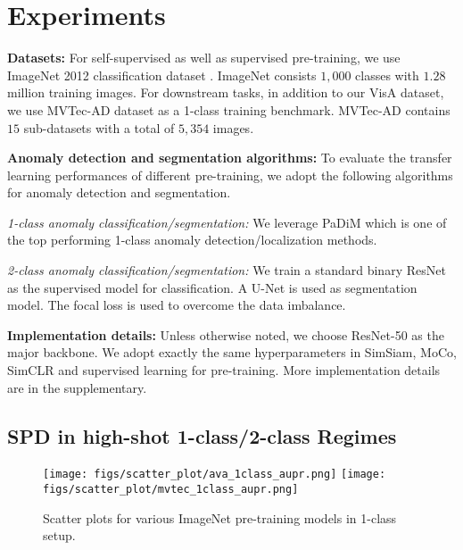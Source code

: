 \section{Experiments}\label{sec:exp}

\noindent\textbf{Datasets:} For self-supervised as well as supervised pre-training, we use ImageNet 2012 classification dataset \cite{deng2009imagenet}. ImageNet consists $1,000$ classes with $1.28$ million training images. For downstream tasks, in addition to our VisA dataset, we use MVTec-AD dataset \cite{bergmann2019mvtec} as a 1-class training benchmark. MVTec-AD contains $15$ sub-datasets with a total of $5,354$ images.

\noindent\textbf{Anomaly detection and segmentation algorithms:} To evaluate the transfer learning performances of different pre-training, we adopt the following algorithms for anomaly detection and segmentation. 

\noindent\emph{1-class anomaly classification/segmentation:} We leverage PaDiM \cite{defard2021padim} which is one of the top performing 1-class anomaly detection/localization methods. 

\noindent\emph{2-class anomaly classification/segmentation:} We train a standard binary ResNet \cite{he2016deep} as the supervised model for classification. A U-Net \cite{ronneberger2015u} is used as segmentation model. The focal loss \cite{lin2017focal} is used to overcome the data imbalance. 

\noindent\textbf{Implementation details:} Unless otherwise noted, we choose ResNet-50 as the major backbone. We adopt exactly the same hyperparameters in SimSiam, MoCo, SimCLR and supervised learning for pre-training. More implementation details are in the supplementary.

\subsection{SPD in high-shot 1-class/2-class Regimes}
\begin{figure}[!t]
\centering
\texttt{[image: figs/scatter\_plot/ava\_1class\_aupr.png]}
\texttt{[image: figs/scatter\_plot/mvtec\_1class\_aupr.png]}\\
 \caption{Scatter plots for various ImageNet pre-training models in 1-class setup.}
 \label{fig:scatter}
\end{figure}


